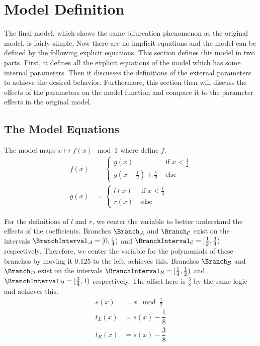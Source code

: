 \section{Model Definition}

The final model, which shows the same bifurcation phenomenon as the original model, is fairly simple.
Now there are no implicit equations and the model can be defined by the following explicit equations.
This section defines this model in two parts.
First, it defines all the explicit equations of the model which has some internal parameters.
Then it discusses the definitions of the external parameters to achieve the desired behavior.
Furthermore, this section then will discuss the effects of the parameters on the model function and compare it to the parameter effects in the original model.

\subsection{The Model Equations}

The model maps $x \mapsto f(x) \mod 1$ where  define $f$.
\begin{align}
    f(x) & = \begin{cases}
                 g(x)                                        & \text{ if } x < \frac{1}{2} \\
                 g\left(x - \frac{1}{2}\right) + \frac{1}{2} & \text{ else}
             \end{cases}
    \label{equ:final.def.f}
    \\
    g(x) & = \begin{cases}
                 l(x) & \text{ if } x < \frac{1}{4} \\
                 r(x) & \text{ else}
             \end{cases}
\end{align}

For the definitions of $l$ and $r$, we center the variable to better understand the effects of the coefficients.
Branches $\Branch_\A$ and $\Branch_\C$ exist on the intervals $\BranchInterval_\A = [0, \frac{1}{4})$ and $\BranchInterval_\C = [\frac{1}{2}, \frac{3}{4})$ respectively.
Therefore, we center the variable for the polynomials of these branches by moving it $0.125$ to the left.
 achieves this.
Branches $\Branch_\B$ and $\Branch_\D$ exist on the intervals $\BranchInterval_\B = [\frac{1}{4}, \frac{1}{2})$ and $\BranchInterval_\D = [\frac{3}{4}, 1)$ respectively.
The offset here is $\frac{3}{8}$ by the same logic and  achieves this.
\begin{align}
    s(x)   & = x \mod \frac{1}{2}                           \\
    t_L(x) & = s(x) - \dfrac{1}{8} \label{equ:final.def.tl} \\
    t_R(x) & = s(x) - \dfrac{3}{8} \label{equ:final.def.tr}
\end{align}

